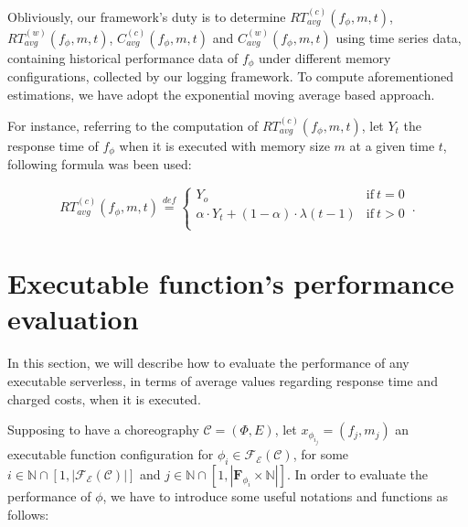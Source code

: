 \documentclass[12pt,a4paper]{report}
\newcommand{\mathDef}{\overset{\textit{def}}{=}}
\newcommand{\N}{\mathbb{N}}
\begin{document}
Obliviously, our framework's duty is to determine $RT_{avg}^{(c)}(f_{\phi}, m,t)$, $RT_{avg}^{(w)}(f_{\phi}, m,t)$, $C_{avg}^{(c)}(f_{\phi}, m,t)$ and $C_{avg}^{(w)}(f_{\phi}, m,t)$ using time series data, containing historical performance data of $f_{\phi}$ under different memory configurations, collected by our logging framework. To compute aforementioned estimations, we have adopt the exponential moving average based approach.

For instance, referring to the computation of $RT_{avg}^{(c)}(f_{\phi}, m,t)$, let $Y_t$ the response time of $f_{\phi}$ when it is executed with memory size $m$ at a given time $t$, following formula was been used:

\begin{equation}
	RT_{avg}^{(c)}(f_{\phi}, m,t) \mathDef
	\begin{cases}
		Y_o & \text{if}\ t = 0\\ 
		\alpha \cdot Y_t + (1 - \alpha) \cdot \lambda(t-1) & \text{if}\ t > 0\\
		
	\end{cases}\,.
\end{equation}

\section{Executable function's performance evaluation}

In this section, we will describe how to evaluate the performance of any executable serverless, in terms of average values regarding response time and charged costs, when it is executed. 

Supposing to have a choreography $\mathcal{C} = (\Phi,E)$, let $x_{\phi_{i_{j}}} = (f_j, m_j)$ an executable function configuration for $\phi_i \in \mathscr{F_E}(\mathcal{C})$, for some $i \in \N \cap [1,|\mathscr{F_E}(\mathcal{C})|]$ and $j \in \N \cap [1,|\textbf{F}_{\phi_{i}} \times \N|]$. In order to evaluate the performance of $\phi$, we have to introduce some useful notations and functions as follows:
\end{document}
